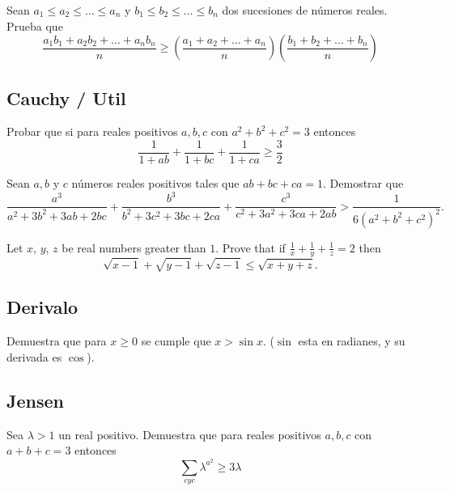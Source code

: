 \documentclass[11pt]{scrartcl}
\begin{document}
\begin{problem}  [Tchebyshev]
Sean $a_1 \leq a_2 \leq \dots \leq a_n$ y $b_1 \leq b_2 \leq \dots \leq b_n$ dos sucesiones de n\'umeros reales. Prueba que 
$$\frac{a_1b_1+a_2b_2 + \dots + a_nb_n}{n} \geq \left(\frac{a_1+a_2+\dots+a_n}{n}\right)\left(\frac{b_1+b_2+\dots+b_n}{n}\right)$$
\end{problem}

\subsection{Cauchy / Util}

\begin{problem} 
Probar que si para reales positivos $a,b,c$ con $a^2+b^2+c^2=3$ entonces
\[ \frac{1}{1+ab}+\frac{1}{1+bc}+\frac{1}{1+ca} \geq \frac32\]

\end{problem}

\begin{problem} [OMCC 2023/3]
    
    Sean $a, b$ y $c$ números reales positivos tales que $a b+b c+c a=1$. Demostrar que
\[
\frac{a^{3}}{a^{2}+3 b^{2}+3 a b+2 b c}+\frac{b^{3}}{b^{2}+3 c^{2}+3 b c+2 c a}+\frac{c^{3}}{c^{2}+3 a^{2}+3 c a+2 a b}>\frac{1}{6\left(a^{2}+b^{2}+c^{2}\right)^{2}} .\]
   
\end{problem}

\begin{problem} [Iran 1998]
    Let $x$, $y$, $z$ be real numbers greater than $1$.
  Prove that if $\frac 1x + \frac 1y + \frac 1z = 2$ then
  \[ \sqrt{x-1} + \sqrt{y-1} + \sqrt{z-1} \le \sqrt{x+y+z}. \]
\end{problem}

\subsection{Derivalo}
\begin{problem}
    Demuestra que para $x\geq 0$ se cumple que $x > \sin x$. ($\sin$ esta en radianes, y su derivada es $\cos$).
\end{problem}

\subsection{Jensen}
\begin{problem}
    Sea $\lambda > 1$ un real positivo. Demuestra que para reales positivos $a,b,c$ con $a+b+c=3$ entonces 
    \[\sum_{cyc} \lambda ^{a^2} \geq 3\lambda\]
\end{problem}
\end{document}
